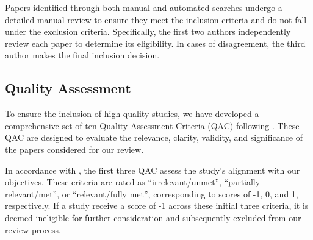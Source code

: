 Papers identified through both manual and automated searches undergo a detailed manual review to ensure they meet the inclusion criteria and do not fall under the exclusion criteria. 
Specifically, the first two authors independently review each paper to determine its eligibility. 
In cases of disagreement, the third author makes the final inclusion decision.

\subsection{Quality Assessment}\label{sec:review_quality}
To ensure the inclusion of high-quality studies, we have developed a comprehensive set of ten Quality Assessment Criteria (QAC) following \cite{hou2024large}. 
These QAC are designed to evaluate the relevance, clarity, validity, and significance of the papers considered for our review.


In accordance with \cite{hou2024large}, the first three QAC assess the study’s alignment with our objectives. These criteria are rated as ``irrelevant/unmet'', ``partially relevant/met'', or ``relevant/fully met'', corresponding to scores of -1, 0, and 1, respectively. 
If a study receive a score of -1 across these initial three criteria, it is deemed ineligible for further consideration and subsequently excluded from our review process.


